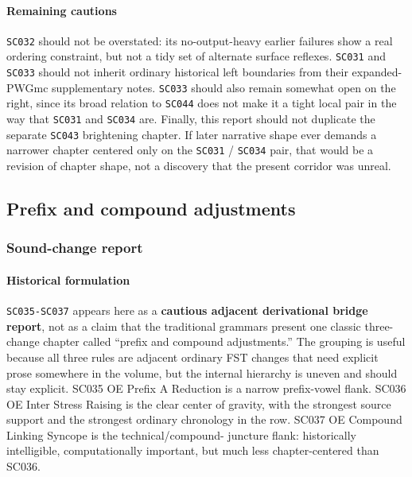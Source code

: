 \documentclass[
  british,
  a4paper,
]{article}
\begin{document}
\paragraph{Remaining cautions}\label{remaining-cautions-22}

\texttt{SC032} should not be overstated: its no-output-heavy earlier
failures show a real ordering constraint, but not a tidy set of
alternate surface reflexes. \texttt{SC031} and \texttt{SC033} should not
inherit ordinary historical left boundaries from their expanded-PWGmc
supplementary notes. \texttt{SC033} should also remain somewhat open on
the right, since its broad relation to \texttt{SC044} does not make it a
tight local pair in the way that \texttt{SC031} and \texttt{SC034} are.
Finally, this report should not duplicate the separate \texttt{SC043}
brightening chapter. If later narrative shape ever demands a narrower
chapter centered only on the \texttt{SC031} / \texttt{SC034} pair, that
would be a revision of chapter shape, not a discovery that the present
corridor was unreal.

\subsection{Prefix and compound
adjustments}\label{prefix-and-compound-adjustments}

\subsubsection{Sound-change report}\label{sound-change-report-23}

\paragraph{Historical formulation}\label{historical-formulation-23}

\texttt{SC035-SC037} appears here as a \textbf{cautious adjacent
derivational bridge report}, not as a claim that the traditional
grammars present one classic three-change chapter called ``prefix and
compound adjustments.'' The grouping is useful because all three rules
are adjacent ordinary FST changes that need explicit prose somewhere in
the volume, but the internal hierarchy is uneven and should stay
explicit. SC035 OE Prefix A Reduction is a narrow prefix-vowel flank.
SC036 OE Inter Stress Raising is the clear center of gravity, with the
strongest source support and the strongest ordinary chronology in the
row. SC037 OE Compound Linking Syncope is the technical/compound-
juncture flank: historically intelligible, computationally important,
but much less chapter-centered than SC036.
\end{document}
